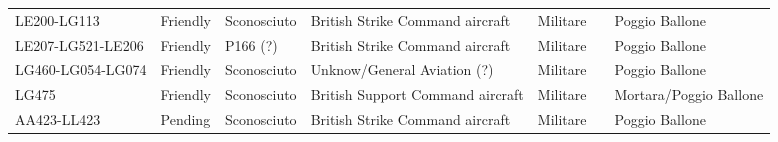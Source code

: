 \documentclass[
]{article}
\begin{document}
\begin{longtable}[]{@{}lllllll@{}}
LE200-LG113 & Friendly & Sconosciuto & British Strike Command aircraft &
Militare & & Poggio Ballone \\
LE207-LG521-LE206 & Friendly & P166 (?) & British Strike Command
aircraft & Militare & & Poggio Ballone \\
LG460-LG054-LG074 & Friendly & Sconosciuto & Unknow/General Aviation (?)
& Militare & & Poggio Ballone \\
LG475 & Friendly & Sconosciuto & British Support Command aircraft &
Militare & & Mortara/Poggio Ballone \\
AA423-LL423 & Pending & Sconosciuto & British Strike Command aircraft &
Militare & & Poggio Ballone \\
\bottomrule
\end{longtable}
\end{document}
